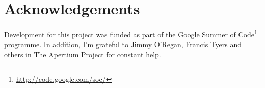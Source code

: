 \documentclass[11pt]{article}
\begin{document}
\section*{Acknowledgements}

Development for this project was funded as part of the Google Summer of Code\footnote{\url{http://code.google.com/soc/}} programme. In addition, I'm
grateful to Jimmy O'Regan, Francis Tyers and others in The Apertium Project for constant help.




\end{document}
